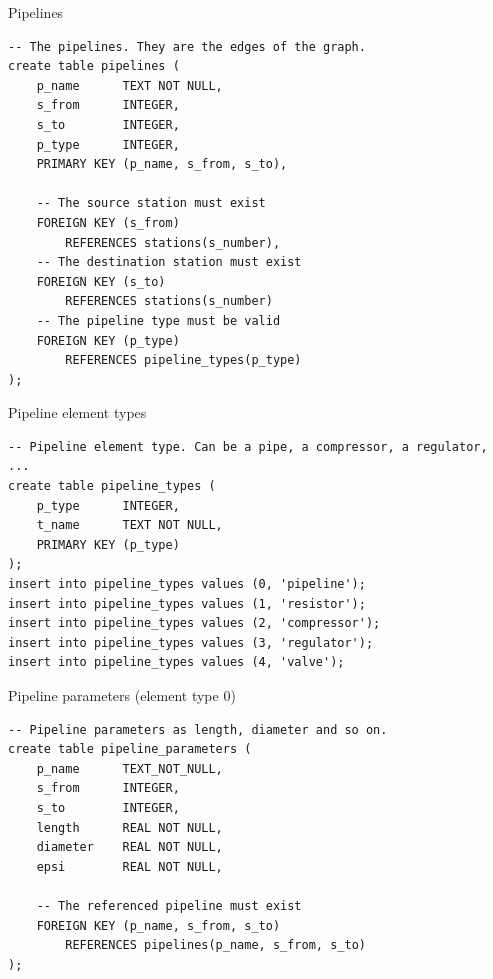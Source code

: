 \documentclass[10pt,aspectratio=169]{beamer}
\begin{document}
\begin{frame}[fragile]{Pipelines}
\begin{verbatim}
-- The pipelines. They are the edges of the graph.
create table pipelines (
    p_name      TEXT NOT NULL,
    s_from      INTEGER,
    s_to        INTEGER,    
    p_type      INTEGER,
    PRIMARY KEY (p_name, s_from, s_to),

    -- The source station must exist
    FOREIGN KEY (s_from)
        REFERENCES stations(s_number),
    -- The destination station must exist
    FOREIGN KEY (s_to)
        REFERENCES stations(s_number)
    -- The pipeline type must be valid
    FOREIGN KEY (p_type)
        REFERENCES pipeline_types(p_type)
);

\end{verbatim}
\end{frame}

\begin{frame}[fragile]{Pipeline element types}
\begin{verbatim}
-- Pipeline element type. Can be a pipe, a compressor, a regulator, ...
create table pipeline_types (
    p_type      INTEGER,
    t_name      TEXT NOT NULL,
    PRIMARY KEY (p_type)
);
insert into pipeline_types values (0, 'pipeline');
insert into pipeline_types values (1, 'resistor');
insert into pipeline_types values (2, 'compressor');
insert into pipeline_types values (3, 'regulator');
insert into pipeline_types values (4, 'valve');
\end{verbatim}
\end{frame}


\begin{frame}[fragile]{Pipeline parameters (element type 0)}
\begin{verbatim}
-- Pipeline parameters as length, diameter and so on.
create table pipeline_parameters (
    p_name      TEXT_NOT_NULL,
    s_from      INTEGER,
    s_to        INTEGER,
    length      REAL NOT NULL,
    diameter    REAL NOT NULL,
    epsi        REAL NOT NULL,

    -- The referenced pipeline must exist
    FOREIGN KEY (p_name, s_from, s_to)
        REFERENCES pipelines(p_name, s_from, s_to)
);
\end{verbatim}
\end{frame}
\end{document}
